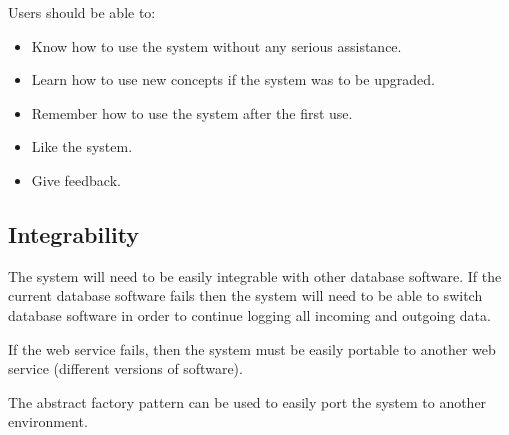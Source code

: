 		Users should be able to:
		\begin{itemize}
		\item Know how to use the system without any serious assistance.
		\item Learn how to use new concepts if the system was to be upgraded.
		\item Remember how to use the system after the first use.
		\item Like the system.
		\item Give feedback. 
		\end{itemize}
		


\subsection{Integrability}
The system will need to be easily integrable with other database software. If the current database software fails then the system will need to be able to switch database software in order to continue logging all incoming and outgoing data. 
		
If the web service fails, then the system must be easily portable to another web service (different versions of software).
		
The abstract factory pattern can be used to easily port the system to another environment. 
